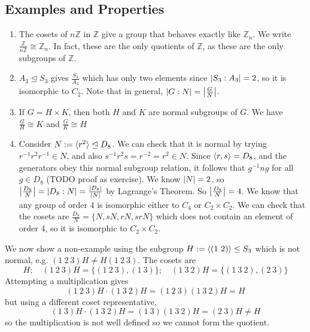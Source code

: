\subsection{Examples and Properties}
\begin{enumerate}
	\item The cosets of \(n\mathbb Z\) in \(\mathbb Z\) give a group that behaves exactly like \(\mathbb Z_n\).
	      We write \(\frac{\mathbb Z}{n\mathbb Z} \cong \mathbb Z_n\).
	      In fact, these are the only quotients of \(\mathbb Z\), as these are the only subgroups of \(\mathbb Z\).
	\item \(A_3 \trianglelefteq S_3\) gives \(\frac{S_3}{A_3}\) which has only two elements since \(\abs{S_3 : A_3} = 2\), so it is isomorphic to \(C_2\).
	      Note that in general, \(\abs{G:N} = \abs{\frac{G}{N}}\).
	\item If \(G = H \times K\), then both \(H\) and \(K\) are normal subgroups of \(G\).
	      We have \(\frac{G}{H} \cong K\) and \(\frac{G}{K} \cong H\) %
	\item Consider \(N := \langle{} r^2 \rangle \trianglelefteq D_8\).
	      We can check that it is normal by trying \(r^{-1}r^2r^{-1} \in N\), and also \(s^{-1}r^2s = r^{-2} = r^2 \in N\).
	      Since \(\langle{} r, s \rangle = D_8\), and the generators obey this normal subgroup relation, it follows that \(g^{-1}ng\) for all \(g \in D_8\) (TODO proof as exercise).
	      We know \(\abs{N} = 2\), so \(\abs{\frac{D_8}{N}} = \abs{D_8 : N} = \frac{\abs{D_8}}{\abs{N}}\) by Lagrange's Theorem.
	      So \(\abs{\frac{D_8}{N}} = 4\).
	      We know that any group of order 4 is isomorphic either to \(C_4\) or \(C_2 \times C_2\).
	      We can check that the cosets are \(\frac{D_8}{N} = \{ N, sN, rN, srN \}\) which does not contain an element of order 4, so it is isomorphic to \(C_2 \times C_2\).
\end{enumerate}
We now show a non-example using the subgroup \(H := \langle{} (1\ 2) \rangle \leq S_3\) which is not normal, e.g.
\((1\ 2\ 3) H \neq H (1\ 2\ 3)\).
The cosets are
\[
	H;\quad (1\ 2\ 3)H = \{(1\ 2\ 3), (1\ 3)\};\quad (1\ 3\ 2)H = \{(1\ 3\ 2), (2\ 3)\}
\]
Attempting a multiplication gives
\[
	(1\ 2\ 3)H \cdot (1\ 3\ 2) H = (1\ 2\ 3) (1\ 3\ 2) H = H
\]
but using a different coset representative,
\[
	(1\ 3)H \cdot (1\ 3\ 2) H = (1\ 3)(1\ 3\ 2) H = (2\ 3)H \neq H
\]
so the multiplication is not well defined so we cannot form the quotient.

